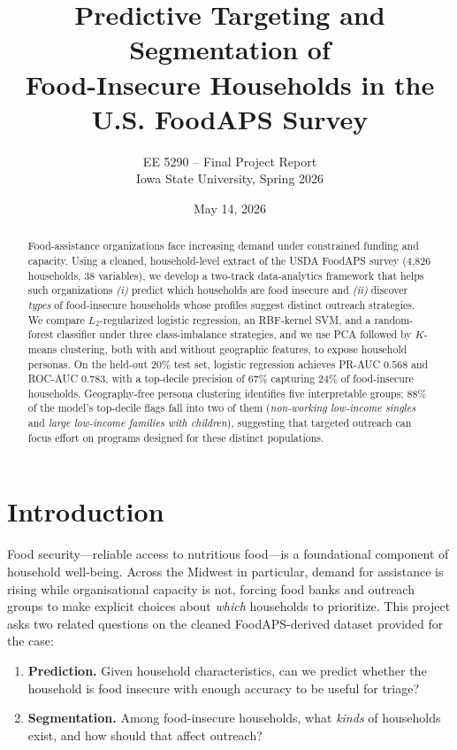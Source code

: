 \documentclass[10pt,letterpaper]{article}
\title{\vspace{-2em}Predictive Targeting and Segmentation of \\ Food-Insecure Households in the U.S. FoodAPS Survey}
\author{EE 5290 -- Final Project Report \\ Iowa State University, Spring 2026}
\date{May 14, 2026}
\begin{document}
\maketitle
\vspace{-2.5em}

\begin{abstract}
\small
Food-assistance organizations face increasing demand under constrained
funding and capacity.  Using a cleaned, household-level extract of the
USDA FoodAPS survey (4{,}826 households, 38 variables), we develop a
two-track data-analytics framework that helps such organizations
\emph{(i)} predict which households are food insecure and
\emph{(ii)} discover \emph{types} of food-insecure households whose profiles
suggest distinct outreach strategies.  We compare $L_2$-regularized
logistic regression, an RBF-kernel SVM, and a random-forest classifier
under three class-imbalance strategies, and we use PCA followed by
$K$-means clustering, both with and without geographic features, to
expose household personas.  On the held-out 20\% test set, logistic
regression achieves PR-AUC $0.568$ and ROC-AUC $0.783$, with a
top-decile precision of 67\% capturing 24\% of food-insecure
households.  Geography-free persona clustering identifies five
interpretable groups; 88\% of the model's top-decile flags fall into
two of them (\emph{non-working low-income singles} and \emph{large
low-income families with children}), suggesting that targeted outreach
can focus effort on programs designed for these distinct populations.
\end{abstract}

\section{Introduction}
Food security---reliable access to nutritious food---is a foundational
component of household well-being.  Across the Midwest in particular,
demand for assistance is rising while organisational capacity is not,
forcing food banks and outreach groups to make explicit choices about
\emph{which} households to prioritize.  This project asks two
related questions on the cleaned FoodAPS-derived dataset provided
for the case:

\begin{enumerate}
\item \textbf{Prediction.}  Given household characteristics, can we
      predict whether the household is food insecure with enough
      accuracy to be useful for triage?
\item \textbf{Segmentation.}  Among food-insecure households, what
      \emph{kinds} of households exist, and how should that affect
      outreach?
\end{enumerate}
\end{document}

